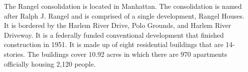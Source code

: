  

The Rangel consolidation is located in Manhattan. The consolidation is named after Ralph J. Rangel and is comprised of a single development, Rangel Houses. It is bordered by the Harlem River Drive, Polo Grounds, and Harlem River Driveway. It is a federally funded conventional development that finished construction in 1951. It is made up of eight residential buildings that are 14-stories. The buildings cover 10.92 acres in which there are 970 apartments officially housing 2,120 people. 